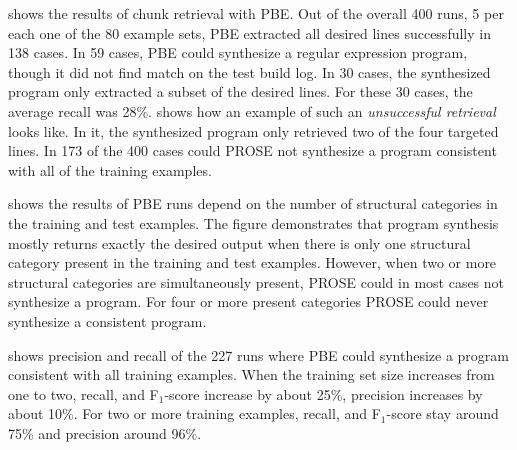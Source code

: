  shows the results of chunk
retrieval with PBE.
Out of the overall 400 runs, 5 per each one of the 80 example
sets, PBE extracted all desired lines successfully in 138 cases.
In 59 cases, PBE could synthesize a regular expression program, though
it did not find match on the test build log.
In 30 cases, the synthesized program only extracted a
subset of the desired lines.
For these 30 cases, the average recall
was 28\%.
 shows how an example of such
an \emph{unsuccessful retrieval} looks like.
In it, the synthesized program only
retrieved two of the four targeted lines.
In 173 of the 400 cases
could PROSE not synthesize a program consistent with all of the training
examples.


 shows the results of PBE
runs depend on the number of structural categories in the training and
test examples.
The figure demonstrates that program synthesis mostly
returns exactly the desired output when there is only one
structural category present in the training and test examples.
However, when
two or more structural categories are simultaneously present,
PROSE could in most cases not synthesize a program.
For four or more present
categories PROSE could never synthesize a consistent program.

 shows
precision and recall of the 227 runs where PBE could synthesize a
program consistent with all training examples.
When the training set
size increases from one to two, recall, and F$_{1}$-score increase by
about 25\%, precision increases by about 10\%.
For two or more
training examples, recall, and F$_{1}$-score stay around 75\% and
precision around 96\%.

